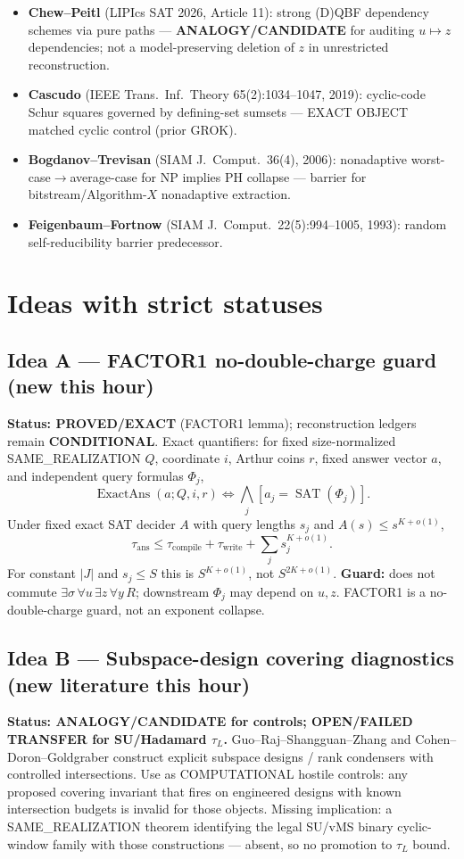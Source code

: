 \documentclass[11pt]{article}
\begin{document}
\begin{itemize}
\item \textbf{Chew--Peitl} (LIPIcs SAT 2026, Article 11): strong (D)QBF dependency schemes via pure
paths --- \textbf{ANALOGY/CANDIDATE} for auditing $u\mapsto z$ dependencies; not a model-preserving
deletion of $z$ in unrestricted reconstruction.
\item \textbf{Cascudo} (IEEE Trans.\ Inf.\ Theory 65(2):1034--1047, 2019): cyclic-code Schur squares
governed by defining-set sumsets --- EXACT OBJECT matched cyclic control (prior GROK).
\item \textbf{Bogdanov--Trevisan} (SIAM J.\ Comput.\ 36(4), 2006): nonadaptive worst-case$\to$average-case
for NP implies PH collapse --- barrier for bitstream/Algorithm-$X$ nonadaptive extraction.
\item \textbf{Feigenbaum--Fortnow} (SIAM J.\ Comput.\ 22(5):994--1005, 1993): random self-reducibility
barrier predecessor.
\end{itemize}

\section*{Ideas with strict statuses}
\subsection*{Idea A --- FACTOR1 no-double-charge guard (new this hour)}
\textbf{Status: PROVED/EXACT} (FACTOR1 lemma); reconstruction ledgers remain \textbf{CONDITIONAL}.
Exact quantifiers: for fixed size-normalized SAME\_REALIZATION $Q$, coordinate $i$, Arthur coins $r$,
fixed answer vector $a$, and independent query formulas $\Phi_j$,
\[
\operatorname{ExactAns}(a;Q,i,r)\iff\bigwedge_j[a_j=\operatorname{SAT}(\Phi_j)].
\]
Under fixed exact SAT decider $A$ with query lengths $s_j$ and $A(s)\le s^{K+o(1)}$,
\[
\tau_{\mathrm{ans}}\le\tau_{\mathrm{compile}}+\tau_{\mathrm{write}}+\sum_j s_j^{K+o(1)}.
\]
For constant $|J|$ and $s_j\le S$ this is $S^{K+o(1)}$, not $S^{2K+o(1)}$.
\textbf{Guard:} does not commute $\exists\sigma\,\forall u\,\exists z\,\forall y\,R$;
downstream $\Phi_j$ may depend on $u,z$. FACTOR1 is a no-double-charge guard, not an exponent collapse.

\subsection*{Idea B --- Subspace-design covering diagnostics (new literature this hour)}
\textbf{Status: ANALOGY/CANDIDATE for controls; OPEN/FAILED TRANSFER for SU/Hadamard $\tau_L$.}
Guo--Raj--Shangguan--Zhang and Cohen--Doron--Goldgraber construct explicit subspace designs / rank
condensers with controlled intersections. Use as COMPUTATIONAL hostile controls: any proposed
covering invariant that fires on engineered designs with known intersection budgets is invalid for
those objects. Missing implication: a SAME\_REALIZATION theorem identifying the legal SU/vMS
binary cyclic-window family with those constructions --- absent, so no promotion to $\tau_L$ bound.
\end{document}
